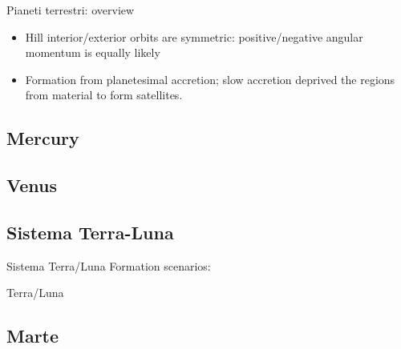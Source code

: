 \begin{wordonframe}{Pianeti terrestri: overview}
\begin{itemize}\item Hill interior/exterior orbits are symmetric: positive/negative angular momentum is equally likely
\item Formation from planetesimal accretion; slow accretion deprived the regions from material to form satellites.

\end{itemize}
\end{wordonframe}

\subsection{Mercury}


\subsection{Venus}


\subsection{Sistema Terra-Luna}
\begin{frame}{Sistema Terra/Luna}
Formation scenarios:
\end{frame}

\begin{wordonframe}{Terra/Luna}

\end{wordonframe}

\subsection{Marte}

